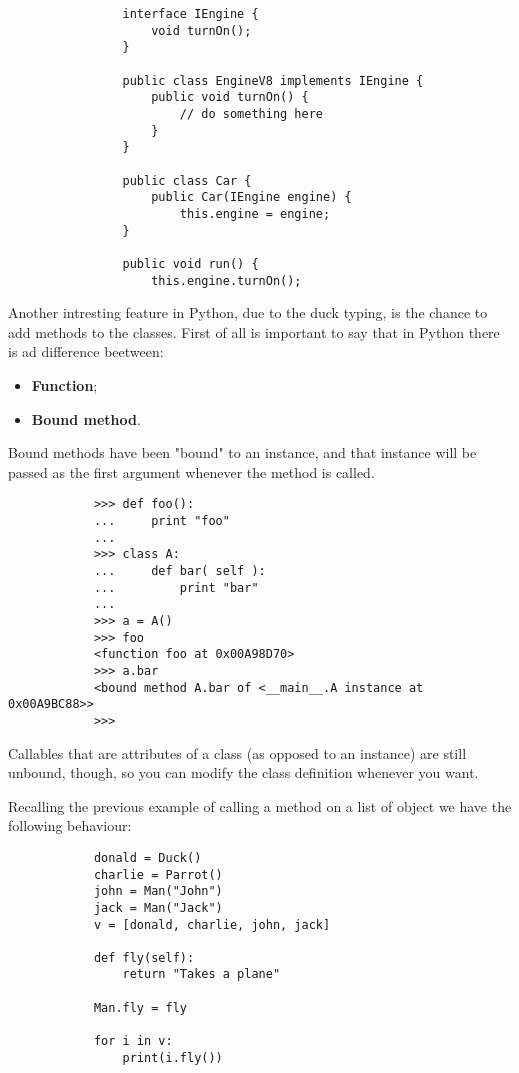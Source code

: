 \documentclass[12pt]{article}
\begin{document}
			\begin{lstlisting}
				interface IEngine {
					void turnOn();
				}
				
				public class EngineV8 implements IEngine {
					public void turnOn() {
						// do something here
					}
				}
				
				public class Car {
					public Car(IEngine engine) {
						this.engine = engine;
				}
				
				public void run() {
					this.engine.turnOn();
			\end{lstlisting}
			
		Another intresting feature in Python, due to the duck typing, is the chance to add methods to the classes. First of all is important to say that in Python there is ad difference beetween:
		\begin{itemize}
			\item \textbf{Function};
			\item \textbf{Bound method}.
		\end{itemize} 
	
		Bound methods have been "bound" to an instance, and that instance will be passed as the first argument whenever the method is called.
		
		\begin{lstlisting}
			>>> def foo():
			...     print "foo"
			...
			>>> class A:
			...     def bar( self ):
			...         print "bar"
			...
			>>> a = A()
			>>> foo
			<function foo at 0x00A98D70>
			>>> a.bar
			<bound method A.bar of <__main__.A instance at 0x00A9BC88>>
			>>>
		\end{lstlisting}
		Callables that are attributes of a class (as opposed to an instance) are still unbound, though, so you can modify the class definition whenever you want.
		
			
		
		Recalling the previous example of calling a method on a list of object we have the following behaviour:
		
		\begin{lstlisting}
			donald = Duck()
			charlie = Parrot()
			john = Man("John")
			jack = Man("Jack")
			v = [donald, charlie, john, jack]
			
			def fly(self):
				return "Takes a plane"
			
			Man.fly = fly
			
			for i in v:
				print(i.fly())
		\end{lstlisting}
		
\end{document}
